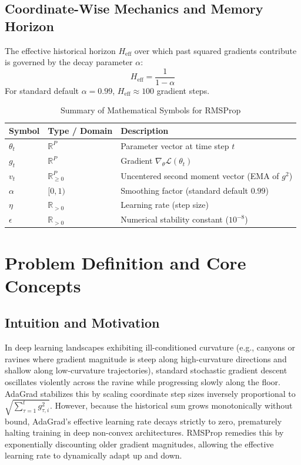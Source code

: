\documentclass[11pt,a4paper]{article}
\theoremstyle{definition}
\begin{document}
\subsection{Coordinate-Wise Mechanics and Memory Horizon}
The effective historical horizon $H_{\text{eff}}$ over which past squared gradients contribute is governed by the decay parameter $\alpha$:
\begin{equation}
H_{\text{eff}} = \frac{1}{1 - \alpha}
\end{equation}
For standard default $\alpha = 0.99$, $H_{\text{eff}} \approx 100$ gradient steps.

\begin{table}[h]
\centering
\caption{Summary of Mathematical Symbols for RMSProp}
\begin{tabular}{lll}
\toprule
\textbf{Symbol} & \textbf{Type / Domain} & \textbf{Description} \\
\midrule
$\theta_t$ & $\mathbb{R}^P$ & Parameter vector at time step $t$ \\
$g_t$ & $\mathbb{R}^P$ & Gradient $\nabla_\theta \mathcal{L}(\theta_t)$ \\
$v_t$ & $\mathbb{R}^P_{\ge 0}$ & Uncentered second moment vector (EMA of $g^2$) \\
$\alpha$ & $[0, 1)$ & Smoothing factor (standard default $0.99$) \\
$\eta$ & $\mathbb{R}_{> 0}$ & Learning rate (step size) \\
$\epsilon$ & $\mathbb{R}_{> 0}$ & Numerical stability constant ($10^{-8}$) \\
\bottomrule
\end{tabular}
\end{table}

\section{Problem Definition and Core Concepts}

\subsection{Intuition and Motivation}
In deep learning landscapes exhibiting ill-conditioned curvature (e.g., canyons or ravines where gradient magnitude is steep along high-curvature directions and shallow along low-curvature trajectories), standard stochastic gradient descent oscillates violently across the ravine while progressing slowly along the floor. AdaGrad stabilizes this by scaling coordinate step sizes inversely proportional to $\sqrt{\sum_{\tau=1}^t g_{\tau, i}^2}$. However, because the historical sum grows monotonically without bound, AdaGrad's effective learning rate decays strictly to zero, prematurely halting training in deep non-convex architectures. RMSProp remedies this by exponentially discounting older gradient magnitudes, allowing the effective learning rate to dynamically adapt up and down.
\end{document}
